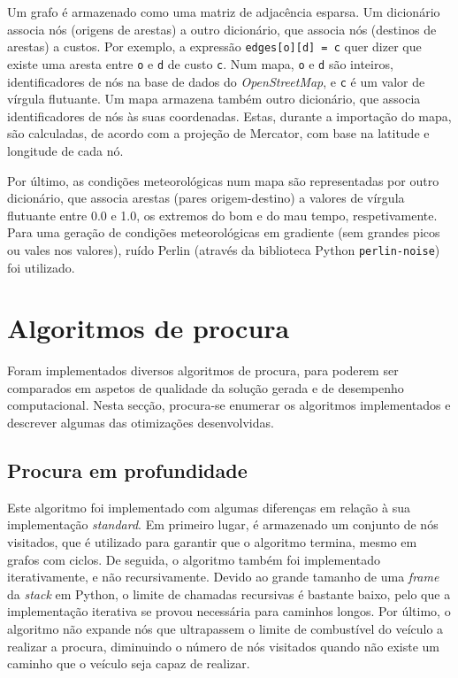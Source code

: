 \documentclass[12pt, a4paper, titlepage]{article}
\begin{document}
Um grafo é armazenado como uma matriz de adjacência esparsa. Um dicionário associa nós (origens de
arestas) a outro dicionário, que associa nós (destinos de arestas) a custos. Por exemplo, a
expressão \texttt{edges[o][d] = c} quer dizer que existe uma aresta entre \texttt{o} e \texttt{d}
de custo \texttt{c}. Num mapa, \texttt{o} e \texttt{d} são inteiros, identificadores de nós na
base de dados do \emph{OpenStreetMap}, e \texttt{c} é um valor de vírgula flutuante. Um mapa
armazena também outro dicionário, que associa identificadores de nós às suas coordenadas. Estas,
durante a importação do mapa, são calculadas, de acordo com a projeção de Mercator, com base na
latitude e longitude de cada nó.

Por último, as condições meteorológicas num mapa são representadas por outro dicionário, que associa
arestas (pares origem-destino) a valores de vírgula flutuante entre 0.0 e 1.0, os extremos do bom e
do mau tempo, respetivamente. Para uma geração de condições meteorológicas em gradiente (sem grandes
picos ou vales nos valores), ruído Perlin (através da biblioteca Python \texttt{perlin-noise}) foi
utilizado.

\section{Algoritmos de procura}

Foram implementados diversos algoritmos de procura, para poderem ser comparados em aspetos de
qualidade da solução gerada e de desempenho computacional. Nesta secção, procura-se enumerar os
algoritmos implementados e descrever algumas das otimizações desenvolvidas.

\subsection{Procura em profundidade}

Este algoritmo foi implementado com algumas diferenças em relação à sua implementação
\emph{standard}. Em primeiro lugar, é armazenado um conjunto de nós visitados, que é utilizado para
garantir que o algoritmo termina, mesmo em grafos com ciclos. De seguida, o algoritmo também foi
implementado iterativamente, e não recursivamente. Devido ao grande tamanho de uma \emph{frame} da
\emph{stack} em Python, o limite de chamadas recursivas é bastante baixo, pelo que a implementação
iterativa se provou necessária para caminhos longos. Por último, o algoritmo não expande nós que
ultrapassem o limite de combustível do veículo a realizar a procura, diminuindo o número de nós
visitados quando não existe um caminho que o veículo seja capaz de realizar.
\end{document}
